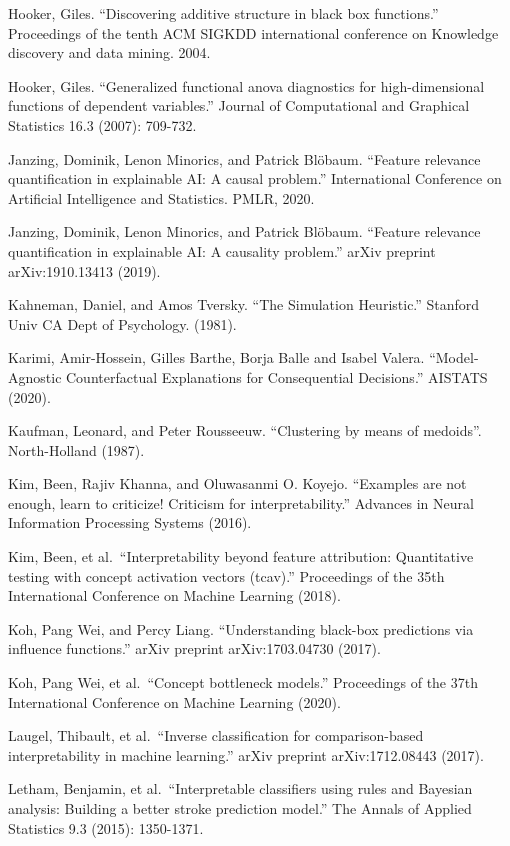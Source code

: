 \documentclass[
  12pt,
]{krantz}
\begin{document}
Hooker, Giles. ``Discovering additive structure in black box functions.'' Proceedings of the tenth ACM SIGKDD international conference on Knowledge discovery and data mining. 2004.

Hooker, Giles. ``Generalized functional anova diagnostics for high-dimensional functions of dependent variables.'' Journal of Computational and Graphical Statistics 16.3 (2007): 709-732.

Janzing, Dominik, Lenon Minorics, and Patrick Blöbaum. ``Feature relevance quantification in explainable AI: A causal problem.'' International Conference on Artificial Intelligence and Statistics. PMLR, 2020.

Janzing, Dominik, Lenon Minorics, and Patrick Blöbaum. ``Feature relevance quantification in explainable AI: A causality problem.'' arXiv preprint arXiv:1910.13413 (2019).

Kahneman, Daniel, and Amos Tversky. ``The Simulation Heuristic.'' Stanford Univ CA Dept of Psychology. (1981).

Karimi, Amir-Hossein, Gilles Barthe, Borja Balle and Isabel Valera. ``Model-Agnostic Counterfactual Explanations for Consequential Decisions.'' AISTATS (2020).

Kaufman, Leonard, and Peter Rousseeuw. ``Clustering by means of medoids''. North-Holland (1987).

Kim, Been, Rajiv Khanna, and Oluwasanmi O. Koyejo. ``Examples are not enough, learn to criticize! Criticism for interpretability.'' Advances in Neural Information Processing Systems (2016).

Kim, Been, et al.~``Interpretability beyond feature attribution: Quantitative testing with concept activation vectors (tcav).'' Proceedings of the 35th International Conference on Machine Learning (2018).

Koh, Pang Wei, and Percy Liang. ``Understanding black-box predictions via influence functions.'' arXiv preprint arXiv:1703.04730 (2017).

Koh, Pang Wei, et al.~``Concept bottleneck models.'' Proceedings of the 37th International Conference on Machine Learning (2020).

Laugel, Thibault, et al.~``Inverse classification for comparison-based interpretability in machine learning.'' arXiv preprint arXiv:1712.08443 (2017).

Letham, Benjamin, et al.~``Interpretable classifiers using rules and Bayesian analysis: Building a better stroke prediction model.'' The Annals of Applied Statistics 9.3 (2015): 1350-1371.
\end{document}
